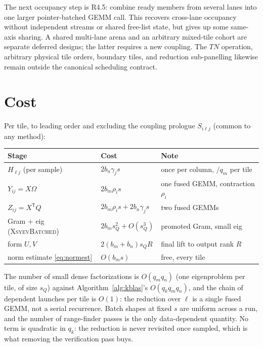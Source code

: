 \documentclass[11pt]{article}
\newcommand{\T}{\mathsf{T}}
\begin{document}
The next occupancy step is R4.5: combine ready members from several lanes into
one larger pointer-batched GEMM call. This recovers cross-lane occupancy without
independent streams or shared free-list state, but gives up some same-axis
sharing. A shared multi-lane arena and an arbitrary mixed-tile cohort are
separate deferred designs; the latter requires a new coupling. The $TN$
operation, arbitrary physical tile orders, boundary tiles, and reduction
sub-panelling likewise remain outside the canonical scheduling contract.

\section{Cost}
\label{sec:cost}

Per tile, to leading order and excluding the coupling prologue $S_{i\ell j}$
(common to any method):

\begin{center}
\begin{tabular}{lll}
\toprule
Stage & Cost & Note \\
\midrule
$H_{\ell j}$ (per sample)        & $2b_n\gamma_j s$ & once per column, $/q_m$ per tile \\
$Y_{ij}=X\Omega$                 & $2b_m\rho_i s$   & one fused GEMM, contraction $\rho_i$ \\
$Z_{ij}=X^{\T}Q$                 & $2b_m\rho_i s+2b_n\gamma_j s$ & two fused GEMMs \\
Gram $+$ eig (\textsc{XsyevBatched}) & $2b_ms_Q^2+O(s_Q^3)$ & promoted Gram, small eig \\
form $U,V$                       & $2(b_m+b_n)s_QR$ & final lift to output rank $R$ \\
norm estimate \eqref{eq:normest} & $O(b_ms)$ & free, every tile \\
\bottomrule
\end{tabular}
\end{center}

The number of small dense factorizations is $O(q_mq_n)$ (one eigenproblem per
tile, of size $s_Q$) against Algorithm~\ref{alg:kblas}'s $O(q_kq_mq_n)$, and
the chain of dependent launches per tile is $O(1)$:
the reduction over $\ell$ is a single fused GEMM, not a serial recurrence. Batch
shapes at fixed $s$ are uniform across a run, and the number of range-finder
passes is the only data-dependent quantity. No term is quadratic in $q_k$: the reduction is never
revisited once sampled, which is what removing the verification pass buys.
\end{document}
